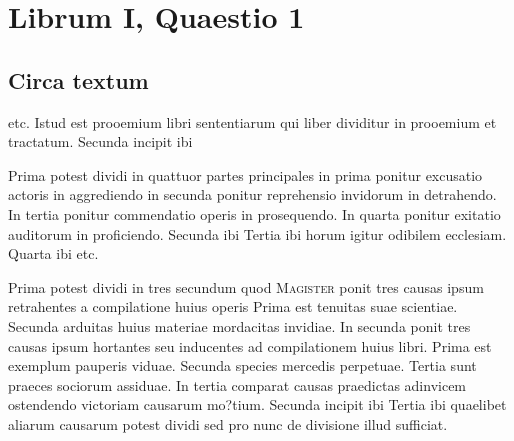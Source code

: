 \documentclass[twoside, openright]{article}
\newcommand{\name}[1]{\textsc{#1}}
\begin{document}
        \chapter*{Librum I, Quaestio 1}
        
         
        \beginnumbering
         
        \bigskip
         \section*{Circa textum} 
        \pstart
          etc. Istud est prooemium libri sententiarum qui liber dividitur in prooemium et tractatum. Secunda incipit ibi  
        \pend
     
        \pstart
        Prima potest dividi in quattuor partes principales in prima ponitur excusatio actoris in aggrediendo in secunda ponitur reprehensio invidorum in detrahendo. In tertia ponitur commendatio operis in prosequendo. In quarta ponitur exitatio auditorum in proficiendo. Secunda ibi  Tertia ibi  horum igitur odibilem ecclesiam.  Quarta ibi  etc.
        \pend
     
        \pstart
        Prima potest dividi in tres secundum quod \name{Magister} ponit tres causas ipsum retrahentes a compilatione huius operis Prima est tenuitas suae scientiae. Secunda arduitas huius materiae mordacitas invidiae. In secunda ponit tres causas ipsum hortantes seu inducentes ad compilationem huius libri. Prima est exemplum pauperis viduae. Secunda species mercedis perpetuae. Tertia sunt praeces sociorum assiduae. In tertia comparat causas praedictas adinvicem ostendendo victoriam causarum mo?tium. Secunda incipit ibi  Tertia ibi  quaelibet aliarum causarum potest dividi sed pro nunc de divisione illud sufficiat.
        \pend
     
\end{document}

